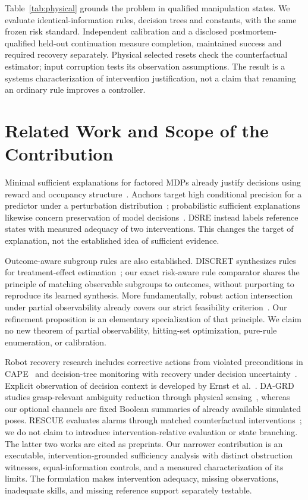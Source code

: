 \documentclass[conference]{IEEEtran}
\begin{document}
Table~\ref{tab:physical} grounds the problem in qualified manipulation states. We evaluate identical-information rules, decision trees and constants, with the same frozen risk standard. Independent calibration and a disclosed postmortem-qualified held-out continuation measure completion, maintained success and required recovery separately. Physical selected resets check the counterfactual estimator; input corruption tests its observation assumptions. The result is a systems characterization of intervention justification, not a claim that renaming an ordinary rule improves a controller.



\section{Related Work and Scope of the Contribution}
Minimal sufficient explanations for factored MDPs already justify decisions using reward and occupancy structure~\cite{khan2009}. Anchors target high conditional precision for a predictor under a perturbation distribution~\cite{anchors}; probabilistic sufficient explanations likewise concern preservation of model decisions~\cite{pse}. DSRE instead labels reference states with measured adequacy of two interventions. This changes the target of explanation, not the established idea of sufficient evidence.

Outcome-aware subgroup rules are also established. DISCRET synthesizes rules for treatment-effect estimation~\cite{discret}; our exact risk-aware rule comparator shares the principle of matching observable subgroups to outcomes, without purporting to reproduce its learned synthesis. More fundamentally, robust action intersection under partial observability already covers our strict feasibility criterion~\cite{partial}. Our refinement proposition is an elementary specialization of that principle. We claim no new theorem of partial observability, hitting-set optimization, pure-rule enumeration, or calibration.

Robot recovery research includes corrective actions from violated preconditions in CAPE~\cite{cape} and decision-tree monitoring with recovery under decision uncertainty~\cite{peddi}. Explicit observation of decision context is developed by Ernst et al.~\cite{ernst}. DA-GRD studies grasp-relevant ambiguity reduction through physical sensing~\cite{dagrd}, whereas our optional channels are fixed Boolean summaries of already available simulated poses. RESCUE evaluates alarms through matched counterfactual interventions~\cite{rescue}; we do not claim to introduce intervention-relative evaluation or state branching. The latter two works are cited as preprints. Our narrower contribution is an executable, intervention-grounded sufficiency analysis with distinct obstruction witnesses, equal-information controls, and a measured characterization of its limits. The formulation makes intervention adequacy, missing observations, inadequate skills, and missing reference support separately testable.
\end{document}
